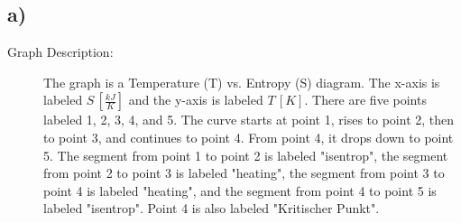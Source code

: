 

\subsection*{a)}

\begin{description}
    \item[Graph Description:] The graph is a Temperature (T) vs. Entropy (S) diagram. The x-axis is labeled \( S \, [\frac{kJ}{K}] \) and the y-axis is labeled \( T \, [K] \). There are five points labeled 1, 2, 3, 4, and 5. The curve starts at point 1, rises to point 2, then to point 3, and continues to point 4. From point 4, it drops down to point 5. The segment from point 1 to point 2 is labeled "isentrop", the segment from point 2 to point 3 is labeled "heating", the segment from point 3 to point 4 is labeled "heating", and the segment from point 4 to point 5 is labeled "isentrop". Point 4 is also labeled "Kritischer Punkt".
\end{description}